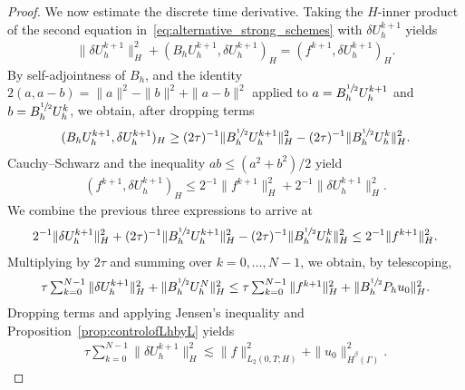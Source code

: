 \documentclass[numbers,webpdf]{ima-authoring-template}%
\theoremstyle{thmstyletwo}%
\numberwithin{equation}{section}
\begin{document}
\begin{proof}
    We now estimate the discrete time derivative. Taking the $H$-inner product of the second equation in~\eqref{eq:alternative_strong_schemes} with $\delta U_h^{k+1}$ yields
    \begin{align*}
    \|\delta U_h^{k+1}\|_H^2
    +(B_hU_h^{k+1},\delta U_h^{k+1})_H
    =(f^{k+1},\delta U_h^{k+1})_H.
    \end{align*}
    By self-adjointness of $B_h$, and the identity $2(a,a-b)=\|a\|^2-\|b\|^2+\|a-b\|^2$ applied to $a=B_h^{\sfrac12}U_h^{k+1}$ and $b=B_h^{\sfrac12}U_h^k$, we obtain, after dropping terms
    \begin{align*}
    (B_hU_h^{k+1},\delta U_h^{k+1})_H
    \geq(2\tau)^{-1}\|B_h^{\sfrac12}U_h^{k+1}\|_H^2-(2\tau)^{-1}\|B_h^{\sfrac12}U_h^k\|_H^2.
    \end{align*}
    Cauchy--Schwarz and the inequality $ab\leq(a^2+b^2)/2$ yield
    \begin{align*}
    (f^{k+1},\delta U_h^{k+1})_H
    \leq2^{-1}\|f^{k+1}\|_H^2+2^{-1}\|\delta U_h^{k+1}\|_H^2.
    \end{align*}
    We combine the previous three expressions to arrive at
    \begin{align*}
    2^{-1}\|\delta U_h^{k+1}\|_H^2
    +(2\tau)^{-1}\|B_h^{\sfrac12}U_h^{k+1}\|_H^2-(2\tau)^{-1}\|B_h^{\sfrac12}U_h^k\|_H^2
    \leq2^{-1}\|f^{k+1}\|_H^2.
    \end{align*}
    Multiplying by $2\tau$ and summing over $k=0,\ldots,N-1$, we obtain, by telescoping,
    \begin{align*}
    \textstyle
    \tau\sum_{k=0}^{N-1}\|\delta U_h^{k+1}\|_H^2
    +\|B_h^{\sfrac12}U_h^N\|_H^2
    \leq\tau\sum_{k=0}^{N-1}\|f^{k+1}\|_H^2
    +\|B_h^{\sfrac12}P_hu_0\|_H^2.
    \end{align*}
    Dropping terms and applying Jensen's inequality and Proposition~\ref{prop:controlofLhbyL} yields
    \begin{align}
    \label{eq:alternative_time_derivative}
    \textstyle
    \tau\sum_{k=0}^{N-1}\|\delta U_h^{k+1}\|_H^2
    \lesssim\|f\|_{L_2(0,T;H)}^2+\|u_0\|_{\dot H^\beta(\Gamma)}^2.
    \end{align}


\end{proof}
\end{document}
